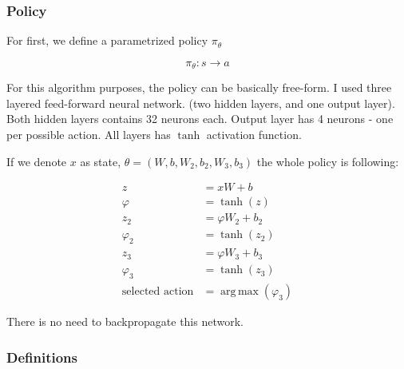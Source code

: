 \documentclass[12pt]{article}
\DeclareMathOperator*{\argmax}{arg\,max}
\begin{document}
\subsubsection{Policy}

For first, we define a parametrized policy $\pi_\theta$

\begin{equation}
\pi_\theta: s \rightarrow a
\end{equation}

For this algorithm purposes, the policy can be basically free-form. I used three layered feed-forward neural network. (two hidden layers, and one output layer).
Both hidden layers contains 32 neurons each. Output layer has 4 neurons - one per possible action. All layers has $\tanh$ activation function.

If we denote $x$ as state, $\theta = (W,b,W_2,b_2,W_3, b_3)$ the whole policy is following:

\begin{equation}
\begin{aligned}
z &= xW + b \\
\varphi &= \tanh(z) \\
z_2 &= \varphi W_2 + b_2 \\
\varphi_2 &= \tanh(z_2) \\
z_3 &= \varphi W_3 + b_3 \\
\varphi_3 &= \tanh(z_3) \\
\text{selected action} &= \argmax(\varphi_3)
\end{aligned}
\end{equation}

There is no need to backpropagate this network.

\subsubsection{Definitions}
\end{document}
